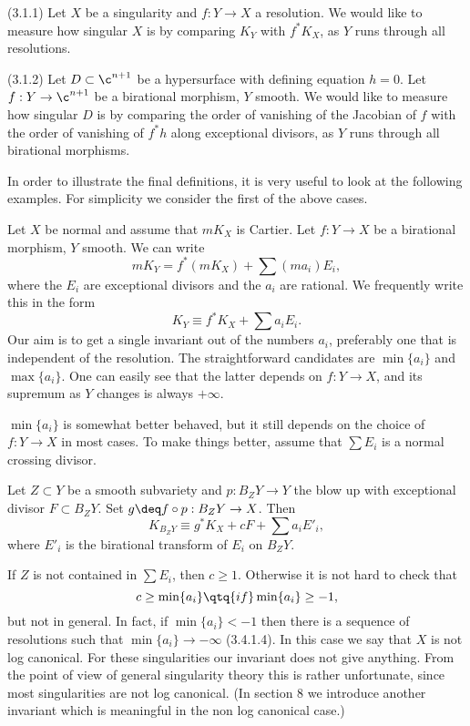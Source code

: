 (3.1.1) Let $X$ be a singularity and $f:Y\to X$ a resolution. We would like to
measure  how singular $X$ is by comparing 
 $K_Y$   with $f^*K_X$, as $Y$
runs through all resolutions.

(3.1.2) Let $D\subset \c^{n+1}$ be a hypersurface with defining equation
$h=0$. Let $f:Y\to \c^{n+1}$ be a birational morphism, $Y$ smooth. We
would like to
measure  how singular $D$ is by comparing the order of vanishing of the
Jacobian of $f$ with the order of vanishing of $f^*h$ along exceptional
divisors, as $Y$ runs through all birational morphisms.

In order to illustrate the final definitions, it is very useful to look at the
following examples. For simplicity we consider the first of the above cases.

  Let $X$ be  normal and assume that   $mK_X$ is Cartier. Let
$f:Y\to X$ be a   birational morphism, $Y$ smooth. We can write 
$$
mK_Y= f^*(mK_X)+\sum (ma_i)E_i,
$$
where the
$E_i$ are  exceptional divisors and the $a_i$ are rational.  We frequently
write this in the form
$$
K_Y\equiv f^*K_X+\sum a_iE_i.
$$
Our aim is to get a single invariant out of the numbers $a_i$, preferably one
that is independent of the resolution. The straightforward candidates are
$\min\{a_i\}$ and  $\max\{a_i\}$. One can easily see that the latter depends on
$f:Y\to X$, and its supremum as $Y$ changes is always $+\infty$.

$\min\{a_i\}$ is somewhat better behaved, but it still depends on the choice of
$f:Y\to X$ in most cases. To make things  better, assume that 
$\sum E_i$ is a normal crossing divisor.

 Let $Z\subset Y$ be a smooth
subvariety and $p:B_ZY\to Y$ the blow up with  exceptional divisor $F\subset
B_ZY$. Set
$g\deq f\circ p:B_ZY\to X$. Then
$$
K_{B_ZY}\equiv g^*K_X+cF+\sum a_iE'_i,
$$
where $E'_i$ is the birational transform of $E_i$ on $B_ZY$.

If $Z$ is not contained in $\sum E_i$, then $c\geq 1$. Otherwise
it is not hard to check that
$$
c\geq \min\{a_i\} \qtq{if} \min\{a_i\}\geq -1,
$$
but not in general.
In fact, if  $\min\{a_i\}<-1$ then there is a  sequence of  resolutions such
that $\min\{a_i\}\to -\infty$ (3.4.1.4). In this case we say that  $X$ is not
log canonical. For these singularities our invariant does not
give anything. From the point of view of general singularity theory this is
rather unfortunate, since most singularities are not log canonical. 
(In section 8 we introduce another invariant which is meaningful in the non
log canonical case.)

